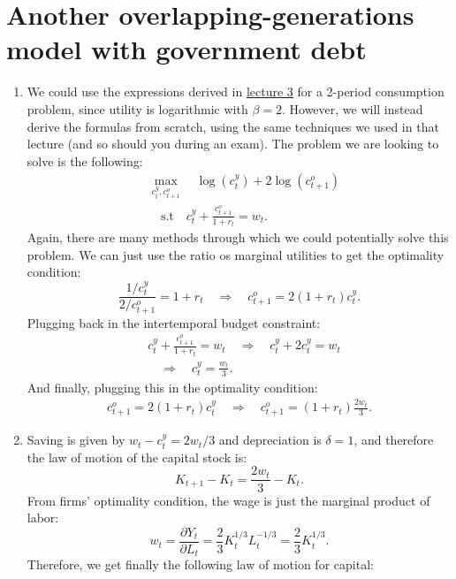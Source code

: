 \documentclass[]{book}
\theoremstyle{definition}
\theoremstyle{definition}
\theoremstyle{definition}
\theoremstyle{remark}
\begin{document}
\section*{Another overlapping-generations model with government
debt}\label{another-overlapping-generations-model-with-government-debt-1}

\begin{enumerate}
\def\labelenumi{\arabic{enumi}.}
\item
  We could use the expressions derived in
  \protect\hyperlink{two-period}{lecture 3} for a 2-period consumption
  problem, since utility is logarithmic with \(\beta = 2\). However, we
  will instead derive the formulas from scratch, using the same
  techniques we used in that lecture (and so should you during an exam).
  The problem we are looking to solve is the following: \[
  \begin{aligned}
  & \max_{c_t^y, c_{t+1}^o} \quad \log(c_t^y) + 2\log(c_{t+1}^o)\\
  & \quad \text{s.t} \quad c_{t}^{y}+\frac{c_{t+1}^{o}}{1+r_t}=w_{t}.
  \end{aligned}
  \] Again, there are many methods through which we could potentially
  solve this problem. We can just use the ratio os marginal utilities to
  get the optimality condition:
  \[\frac{1/c_t^y}{2/c_{t+1}^o}=1+r_t \quad \Rightarrow \quad c_{t+1}^o = 2(1+r_t)c_t^y.\]
  Plugging back in the intertemporal budget constraint: \[
  \begin{aligned}
  &c_{t}^{y}+\frac{c_{t+1}^{o}}{1+r_t}=w_{t} \quad \Rightarrow \quad c_t^y + 2 c_t^y = w_t\\
  &\quad \Rightarrow \quad \boxed{c_t^y = \frac{w_t}{3}}.
  \end{aligned}
  \] And finally, plugging this in the optimality condition: \[
  \begin{aligned}
  c_{t+1}^o = 2(1+r_t)c_t^y \quad \Rightarrow \quad \boxed{c_{t+1}^o = (1+r_t)\frac{2w_t}{3}}.
  \end{aligned}
  \]
\item
  Saving is given by \(w_t - c_t^y = 2w_t/3\) and depreciation is
  \(\delta = 1\), and therefore the law of motion of the capital stock
  is: \[K_{t+1} - K_t = \frac{2w_t}{3}-K_t.\] From firms' optimality
  condition, the wage is just the marginal product of labor:
  \[w_{t}=\frac{\partial Y_{t}}{\partial L_{t}}=\frac{2}{3}K_{t}^{1/3}L_{t}^{-1/3}=\frac{2}{3}K_{t}^{1/3}.\]
  Therefore, we get finally the following law of motion for capital:

\end{enumerate}
\end{document}

